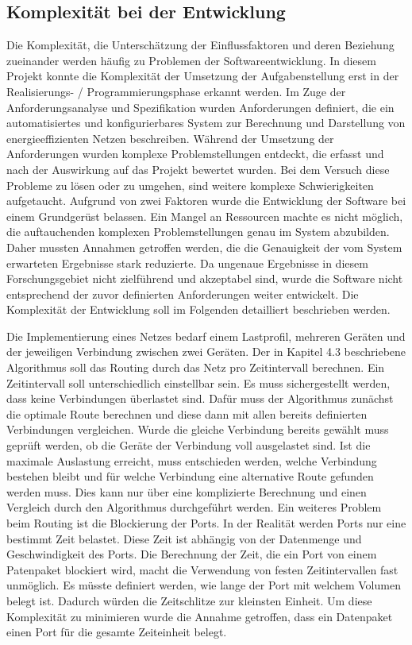 \documentclass[12pt,titlepage]{article}
\begin{document}
\subsection{Komplexität bei der Entwicklung}
Die Komplexität, die Unterschätzung der Einflussfaktoren und deren Beziehung zueinander werden häufig zu Problemen der Softwareentwicklung. In diesem Projekt konnte die Komplexität der Umsetzung der Aufgabenstellung erst in der Realisierungs- / Programmierungsphase erkannt werden. Im Zuge der Anforderungsanalyse und Spezifikation wurden Anforderungen definiert, die ein automatisiertes und konfigurierbares System zur Berechnung und Darstellung von energieeffizienten Netzen beschreiben. Während der Umsetzung der Anforderungen wurden komplexe Problemstellungen entdeckt, die erfasst und nach der Auswirkung auf das Projekt bewertet wurden. Bei dem Versuch diese Probleme zu lösen oder zu umgehen, sind weitere komplexe Schwierigkeiten aufgetaucht. Aufgrund von zwei Faktoren wurde die Entwicklung der Software bei einem Grundgerüst belassen. Ein Mangel an Ressourcen machte es nicht möglich, die auftauchenden komplexen Problemstellungen genau im System abzubilden. Daher mussten Annahmen getroffen werden, die die Genauigkeit der vom System erwarteten Ergebnisse stark reduzierte. Da ungenaue Ergebnisse in diesem Forschungsgebiet nicht zielführend und akzeptabel sind, wurde die Software nicht entsprechend der zuvor definierten Anforderungen weiter entwickelt. Die Komplexität der Entwicklung soll im Folgenden detailliert beschrieben werden.  


Die Implementierung eines Netzes bedarf einem Lastprofil, mehreren Geräten und der jeweiligen Verbindung zwischen zwei Geräten. Der in Kapitel 4.3 beschriebene Algorithmus soll das Routing durch das Netz pro Zeitintervall berechnen. Ein Zeitintervall soll unterschiedlich einstellbar sein. Es muss sichergestellt werden, dass keine Verbindungen überlastet sind. Dafür muss der Algorithmus zunächst die optimale Route berechnen und diese dann mit allen bereits definierten Verbindungen vergleichen. Wurde die gleiche Verbindung bereits gewählt muss geprüft werden, ob die Geräte der Verbindung voll ausgelastet sind. Ist die maximale Auslastung erreicht, muss entschieden werden, welche Verbindung bestehen bleibt und für welche Verbindung eine alternative Route gefunden werden muss. Dies kann nur über eine komplizierte Berechnung und einen Vergleich durch den Algorithmus durchgeführt werden. Ein weiteres Problem beim Routing ist die Blockierung der Ports. In der Realität werden Ports nur eine bestimmt Zeit belastet. Diese Zeit ist abhängig von der Datenmenge und Geschwindigkeit des Ports. Die Berechnung der Zeit, die ein Port von einem Patenpaket blockiert wird, macht  die Verwendung von festen Zeitintervallen fast unmöglich. Es müsste  definiert werden, wie lange der Port mit welchem Volumen belegt ist. Dadurch würden die Zeitschlitze zur kleinsten Einheit. Um diese Komplexität zu minimieren wurde die Annahme getroffen, dass ein Datenpaket einen Port für die gesamte Zeiteinheit belegt. 
\end{document}
